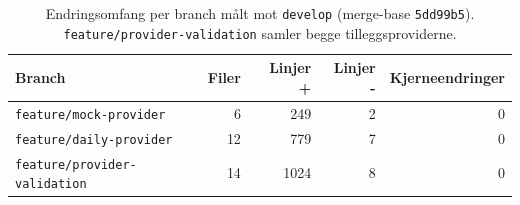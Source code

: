 \begin{table}[H]
\centering
\begin{tabular}{lrrrr}
\toprule
\textbf{Branch} & \textbf{Filer} & \textbf{Linjer +} &
\textbf{Linjer -} & \textbf{Kjerneendringer} \\
\midrule
\texttt{feature/mock-provider}       &  6 &  249 & 2 & 0 \\
\texttt{feature/daily-provider}      & 12 &  779 & 7 & 0 \\
\texttt{feature/provider-validation} & 14 & 1024 & 8 & 0 \\
\bottomrule
\end{tabular}
\caption[Endringsomfang per branch målt mot \texttt{develop}]{Endringsomfang per branch målt mot \texttt{develop}
(merge-base \texttt{5dd99b5}). \texttt{feature/provider-validation}
samler begge tilleggsproviderne.}
\label{tab:provider-validering}
\end{table}